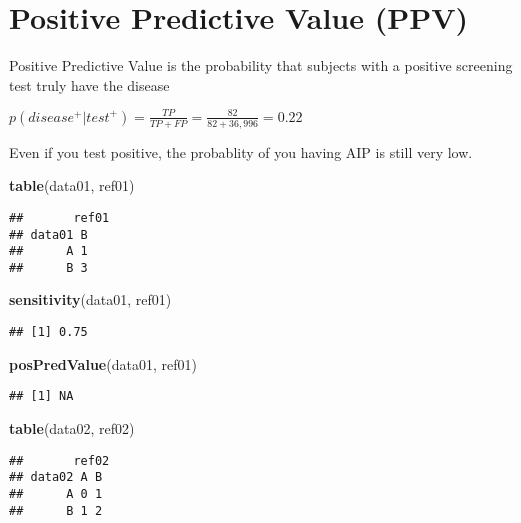 \documentclass[]{article}
\newenvironment{Shaded}{\begin{snugshade}}{\end{snugshade}}
\newcommand{\KeywordTok}[1]{\textcolor[rgb]{0.13,0.29,0.53}{\textbf{#1}}}
\newcommand{\NormalTok}[1]{#1}
\begin{document}
\hypertarget{positive-predictive-value-ppv}{%
\section{Positive Predictive Value
(PPV)}\label{positive-predictive-value-ppv}}

Positive Predictive Value is the probability that subjects with a
positive screening test truly have the disease

\(p(disease^+|test^+) = \frac{TP}{TP+FP}=\frac{82}{82+36,996}=0.22\)

Even if you test positive, the probablity of you having AIP is still
very low.

\begin{Shaded}
\begin{Highlighting}[]
\KeywordTok{table}\NormalTok{(data01, ref01)}
\end{Highlighting}
\end{Shaded}

\begin{verbatim}
##       ref01
## data01 B
##      A 1
##      B 3
\end{verbatim}

\begin{Shaded}
\begin{Highlighting}[]
\KeywordTok{sensitivity}\NormalTok{(data01, ref01) }
\end{Highlighting}
\end{Shaded}

\begin{verbatim}
## [1] 0.75
\end{verbatim}

\begin{Shaded}
\begin{Highlighting}[]
\KeywordTok{posPredValue}\NormalTok{(data01, ref01) }
\end{Highlighting}
\end{Shaded}

\begin{verbatim}
## [1] NA
\end{verbatim}

\begin{Shaded}
\begin{Highlighting}[]
\KeywordTok{table}\NormalTok{(data02, ref02)}
\end{Highlighting}
\end{Shaded}

\begin{verbatim}
##       ref02
## data02 A B
##      A 0 1
##      B 1 2
\end{verbatim}
\end{document}
